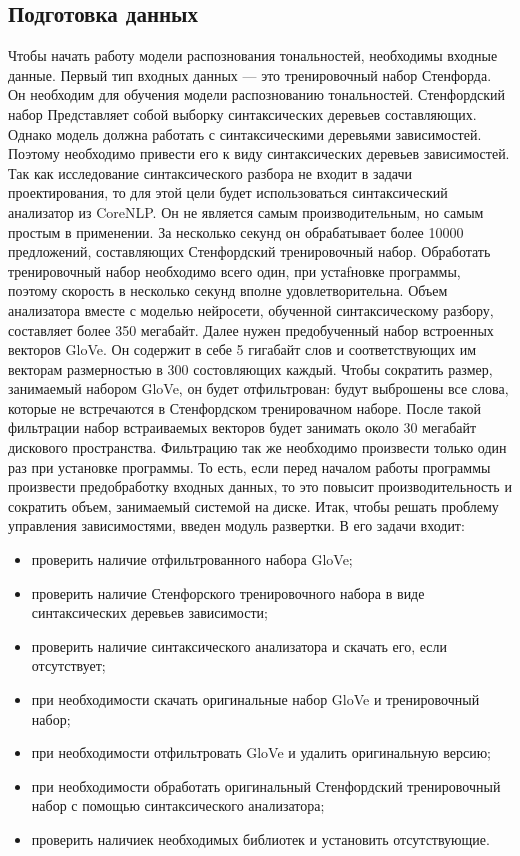 \subsection{Подготовка данных}\label{subsec:sys:data_gathering}
Чтобы начать работу модели распознования тональностей, необходимы входные данные. Первый тип входных данных --- это тренировочный набор Стенфорда. Он необходим для обучения модели распознованию тональностей. Стенфордский набор Представляет собой выборку синтаксических деревьев составляющих. Однако модель должна работать с синтаксическими деревьями зависимостей. Поэтому необходимо привести его к виду синтаксических деревьев зависимостей. Так как исследование синтаксического разбора не входит в задачи проектирования, то для этой цели будет использоваться синтаксический анализатор из CoreNLP\@. Он не является самым производительным, но самым простым в применении. За несколько секунд он обрабатывает более 10000 предложений, составляющих Стенфордский тренировочный набор. Обработать тренировочный набор необходимо всего один, при устаfновке программы, поэтому скорость в несколько секунд вполне удовлетворительна. Объем анализатора вместе с моделью нейросети, обученной синтаксическому разбору, составляет более 350 мегабайт. Далее нужен предобученный набор встроенных векторов GloVe\@. Он содержит в себе 5 гигабайт слов и соответствующих им векторам размерностью в 300 состовляющих каждый. Чтобы сократить размер, занимаемый набором GloVe\@, он будет отфильтрован: будут выброшены все слова, которые не встречаются в Стенфордском тренировачном наборе. После такой фильтрации набор встраиваемых векторов будет занимать около 30 мегабайт дискового пространства. Фильтрацию так же необходимо произвести только один раз при установке программы. То есть, если перед началом работы программы произвести предобработку входных данных, то это повысит производительность и сократить объем, занимаемый системой на диске. Итак, чтобы решать проблему управления зависимостями, введен модуль развертки. В его задачи входит:

\begin{itemize}
\item проверить наличие отфильтрованного набора GloVe;
\item проверить наличие Стенфорского тренировочного набора в виде синтаксических деревьев зависимости;
\item проверить наличие синтаксического анализатора и скачать его, если отсутствует;
\item при необходимости скачать оригинальные набор GloVe и тренировочный набор;
\item при необходимости отфильтровать GloVe и удалить оригинальную версию;
\item при необходимости обработать оригинальный Стенфордский тренировочный набор с помощью синтаксического анализатора;
\item проверить наличиек необходимых библиотек и установить отсутствующие.
\end{itemize}

